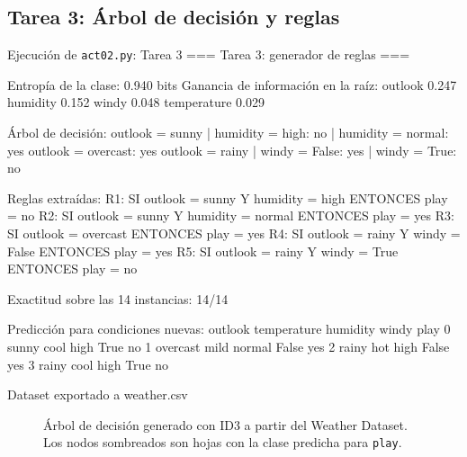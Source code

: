 \documentclass[11pt,letterpaper]{article}
\begin{document}
\subsection{Tarea 3: Árbol de decisión y reglas}

\begin{consola}[label=out:tarea3]{Ejecución de \texttt{act02.py}: Tarea 3}
=== Tarea 3: generador de reglas ===

Entropía de la clase: 0.940 bits
Ganancia de información en la raíz:
  outlook      0.247
  humidity     0.152
  windy        0.048
  temperature  0.029

Árbol de decisión:
outlook = sunny
|   humidity = high: no
|   humidity = normal: yes
outlook = overcast: yes
outlook = rainy
|   windy = False: yes
|   windy = True: no

Reglas extraídas:
R1: SI outlook = sunny Y humidity = high ENTONCES play = no
R2: SI outlook = sunny Y humidity = normal ENTONCES play = yes
R3: SI outlook = overcast ENTONCES play = yes
R4: SI outlook = rainy Y windy = False ENTONCES play = yes
R5: SI outlook = rainy Y windy = True ENTONCES play = no

Exactitud sobre las 14 instancias: 14/14

Predicción para condiciones nuevas:
    outlook temperature humidity  windy play
0     sunny        cool     high   True   no
1  overcast        mild   normal  False  yes
2     rainy         hot     high  False  yes
3     rainy        cool     high   True   no

Dataset exportado a weather.csv
\end{consola}

\begin{figure}[htbp]
\centering
{}
\caption{Árbol de decisión generado con ID3 a partir del Weather Dataset. Los nodos sombreados son hojas con la clase predicha para \texttt{play}.}
\label{fig:arbol}
\end{figure}
\end{document}
